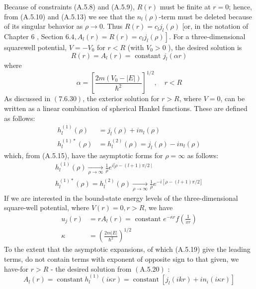 \documentclass{article}
\begin{document}
Because of constraints (A.5.8) and (A.5.9), $R(r)$ must be finite at $r=0$; hence, from (A.5.10) and (A.5.13) we see that the $n_{l}(\rho)$-term must be deleted because of its singular behavior as $\rho \rightarrow 0$. Thus $R(r)=c_{l} j_{l}(\rho)$ [or, in the notation of Chapter 6 , Section $\left.6.4, A_{l}(r)=R(r)=c_{l} j_{l}(\rho)\right]$. For a three-dimensional squarewell potential, $V=-V_{0}$ for $r<R$ (with $V_{0}>0$ ), the desired solution is
\begin{equation}
R(r)=A_{l}(r)=\text { constant } j_{l}(\alpha r)
\end{equation}
where
\begin{equation}
\alpha=\left[\frac{2 m\left(V_{0}-|E|\right)}{\hbar^{2}}\right]^{1 / 2}, \quad r<R
\end{equation}
As discussed in $(7.6 .30)$, the exterior solution for $r>R$, where $V=0$, can be written as a linear combination of spherical Hankel functions. These are defined as follows:
\begin{equation}
\begin{aligned}
h_{l}^{(1)}(\rho) &=j_{l}(\rho)+i n_{l}(\rho) \\
h_{l}^{(1) *}(\rho) &=h_{l}^{(2)}(\rho)=j_{l}(\rho)-i n_{l}(\rho)
\end{aligned}
\end{equation}
which, from (A.5.15), have the asymptotic forms for $\rho=\infty$ as follows:
\begin{equation}
\begin{gathered}
h_{l}^{(1)}(\rho) \underset{\rho \rightarrow \infty}{\longrightarrow} \frac{1}{\rho} e^{i[\rho-(l+1) \pi / 2 \mid} \\
h_{l}^{(1) *}(\rho)=h_{l}^{(2)}(\rho) \underset{\rho \rightarrow \infty}{\longrightarrow} \frac{1}{\rho} e^{-i[\rho-(l+1) \pi / 2]}
\end{gathered}
\end{equation}
If we are interested in the bound-state energy levels of the three-dimensional square-well potential, where $V(r)=0, r>R$, we have
\begin{equation}
\begin{aligned}
u_{j}(r) &=r A_{l}(r)=\text { constant } e^{-\kappa r} f\left(\frac{1}{x r}\right) \\
\kappa &=\left(\frac{2 m|E|}{\hbar^{2}}\right)^{1 / 2}
\end{aligned}
\end{equation}
To the extent that the asymptotic expansions, of which (A.5.19) give the leading terms, do not contain terms with exponent of opposite sign to that given, we have-for $r>R$ - the desired solution from $(\mathrm{A} .5 .20)$ :
\begin{equation}
A_{l}(r)=\operatorname{constant} h_{l}^{(1)}(i \kappa r)=\operatorname{constant}\left[j_{l}(i k r)+i n_{i}(i \kappa r)\right]
\end{equation}
\end{document}
